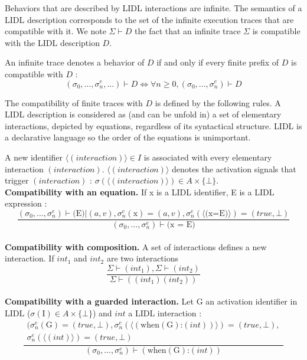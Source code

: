 Behaviors that  are described by LIDL interactions are  infinite. The
semantics of a LIDL description corresponds to the set of the infinite
execution traces that  are compatible with it. We  note $\Sigma \vdash
D$ the  fact that an  infinite trace  $\Sigma$ is compatible  with the
LIDL description $D$.

An infinite trace denotes a behavior of $D$ if and only if every
finite prefix of $D$ is compatible with $D$ :
$$(\sigma_0,\ldots,\sigma_n^e,\ldots) \vdash D \Longleftrightarrow
\forall n \geq 0 , (\sigma_0,\ldots,\sigma_n^e) \vdash D$$

The compatibility of finite traces with $D$ is defined by the
following rules. A LIDL description is considered as  (and can be
unfold in) a set of elementary interactions, depicted by equations, regardless of its syntactical
structure. LIDL is a declarative language so the order of the equations is unimportant. 

A new identifier $\langle (interaction) \rangle
\in I$ is associated with every elementary interaction $(interaction)$. $\langle (interaction) \rangle$ denotes the activation signals
that trigger $(interaction)$ : $\sigma(\langle (interaction)
\rangle) \in A \times \{\bot\}$.\\
\noindent
\textbf{Compatibility with an equation.} If x is a LIDL identifier, E
is a LIDL expression :
$$\frac{(\sigma_0,\ldots,\sigma_n^e) \vdash \mbox{(E)} | (a,v),
  \sigma_n^e(\mbox{x}) =
  (a,v), \sigma_n^e(\langle \mbox{(x=E)} \rangle) = (true, \bot)}
{(\sigma_0,\ldots,\sigma_n^e) \vdash \mbox{(x = E)}}
$$\\
\noindent
\textbf{Compatibility with composition.} A set of interactions defines
a new interaction. If $int_1$ and $int_2$ are two interactions
$$\frac{\Sigma \vdash (int_1),\Sigma \vdash (int_2) }
{\Sigma \vdash ((int_1) (int_2))}$$\\
\noindent
\textbf{Compatibility with a guarded interaction.} Let G  an activation
identifier in LIDL ($\sigma(\mbox{I}) \in A \times \{\bot\}$) and $int$ 
a LIDL interaction :
$$\frac{
\begin{array}{c}
(\sigma_n^e(\mbox{G}) =(true,\bot),
\sigma_n^e(\langle (\mbox{when} (\mbox{G}) \mbox{:} (int) ) \rangle) =
(true, \bot),\\
 \sigma_n^e(\langle (int) \rangle) = (true,\bot)
\end{array}
}
{(\sigma_0,\ldots,\sigma_n^e) \vdash (\mbox{when} (\mbox{G}) \mbox{:}
  (int) )} 
$$
